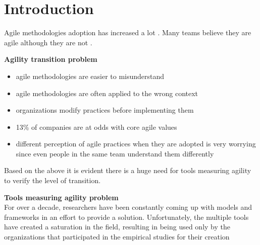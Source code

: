 \section{Introduction}
Agile methodologies adoption has increased a lot \cite{laurie_williams, Wang_Conboy, Salo_Abrahamsson}. Many teams believe they are agile although they are not \cite{ambysoft}.

\textbf{Agility transition problem}
\begin{itemize}
	\item agile methodologies are easier to misunderstand \cite{6427226}
	\item agile methodologies are often applied to the wrong context \cite{cefam}
	\item organizations modify practices before implementing them \cite{1579312, 1629340}
	\item 13\% of companies are at odds with core agile values \cite{versionOne}
	\item different perception of agile practices when they are adopted is very worrying \cite{poonacha} since even people in the same team understand them differently \cite{ambler}
\end{itemize}

Based on the above it is evident there is a huge need for tools measuring agility to verify the level of transition.

\textbf{Tools measuring agility problem} \\
For over a decade, researchers have been constantly coming up with models and frameworks in an effort to provide a solution. Unfortunately, the multiple tools have created a saturation in the field, resulting in being used only by the organizations that participated in the empirical studies for their creation \cite{samireh_jalali_dissertation, jalali_angelis}


\clearpage